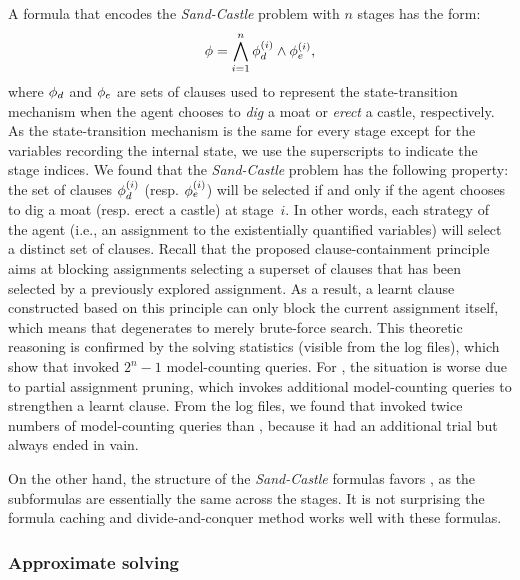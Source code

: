 A formula that encodes the \textit{Sand-Castle} problem with $n$ stages has the form:
\begin{align}
    \phi=\bigwedge_{i=1}^n \phi_d^{(i)}\land\phi_e^{(i)},
\end{align}
where $\phi_d$ and $\phi_e$ are sets of clauses used to represent the state-transition mechanism
when the agent chooses to \textit{dig} a moat or \textit{erect} a castle, respectively.
As the state-transition mechanism is the same for every stage except for the variables recording the internal state,
we use the superscripts to indicate the stage indices.
We found that the \textit{Sand-Castle} problem has the following property:
the set of clauses $\phi_d^{(i)}$ (resp. $\phi_e^{(i)}$) will be selected
if and only if the agent chooses to dig a moat (resp. erect a castle) at stage~$i$.
In other words, each strategy of the agent (i.e., an assignment to the existentially quantified variables)
will select a distinct set of clauses.
Recall that the proposed clause-containment principle aims at blocking assignments
selecting a superset of clauses that has been selected by a previously explored assignment.
As a result, a learnt clause constructed based on this principle can only block the current assignment itself,
which means that \erssatb degenerates to merely brute-force search.
This theoretic reasoning is confirmed by the solving statistics (visible from the log files),
which show that \erssatb invoked $2^n-1$ model-counting queries.
For \erssat, the situation is worse due to partial assignment pruning,
which invokes additional model-counting queries to strengthen a learnt clause.
From the log files, we found that \erssat invoked twice numbers of model-counting queries than \erssatb,
because it had an additional trial but always ended in vain.

On the other hand, the structure of the \textit{Sand-Castle} formulas favors \dcssat,
as the subformulas are essentially the same across the stages.
It is not surprising the formula caching and divide-and-conquer method works well with these formulas.

\subsubsection{Approximate solving}

